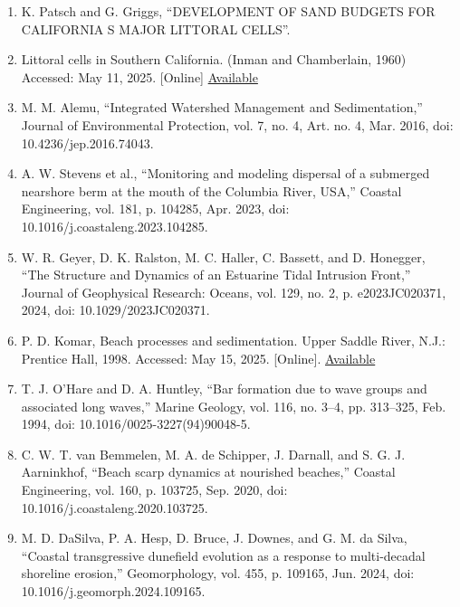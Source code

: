 \documentclass{article}
\begin{document}
{\begin{enumerate}
    \item{K. Patsch and G. Griggs, “DEVELOPMENT OF SAND BUDGETS FOR CALIFORNIA S MAJOR LITTORAL CELLS”.}

    \item{Littoral cells in Southern California. (Inman and Chamberlain, 1960) Accessed: May 11, 2025. [Online] \href{https://www.researchgate.net/figure/Littoral-cells-in-Southern-California-Inman-and-Chamberlain-1960-Thurman-and_fig4_240635473}{Available}}

    \item{M. M. Alemu, “Integrated Watershed Management and Sedimentation,” Journal of Environmental Protection, vol. 7, no. 4, Art. no. 4, Mar. 2016, doi: 10.4236/jep.2016.74043.}

    \item{A. W. Stevens et al., “Monitoring and modeling dispersal of a submerged nearshore berm at the mouth of the Columbia River, USA,” Coastal Engineering, vol. 181, p. 104285, Apr. 2023, doi: 10.1016/j.coastaleng.2023.104285.}

    \item{W. R. Geyer, D. K. Ralston, M. C. Haller, C. Bassett, and D. Honegger, “The Structure and Dynamics of an Estuarine Tidal Intrusion Front,” Journal of Geophysical Research: Oceans, vol. 129, no. 2, p. e2023JC020371, 2024, doi: 10.1029/2023JC020371.}

    \item{P. D. Komar, Beach processes and sedimentation. Upper Saddle River, N.J.: Prentice Hall, 1998. Accessed: May 15, 2025. [Online]. \href{http://archive.org/details/beachprocessesse0002koma}{Available}}

    \item{T. J. O’Hare and D. A. Huntley, “Bar formation due to wave groups and associated long waves,” Marine Geology, vol. 116, no. 3–4, pp. 313–325, Feb. 1994, doi: 10.1016/0025-3227(94)90048-5.}

    \item{C. W. T. van Bemmelen, M. A. de Schipper, J. Darnall, and S. G. J. Aarninkhof, “Beach scarp dynamics at nourished beaches,” Coastal Engineering, vol. 160, p. 103725, Sep. 2020, doi: 10.1016/j.coastaleng.2020.103725.}

    \item{M. D. DaSilva, P. A. Hesp, D. Bruce, J. Downes, and G. M. da Silva, “Coastal transgressive dunefield evolution as a response to multi-decadal shoreline erosion,” Geomorphology, vol. 455, p. 109165, Jun. 2024, doi: 10.1016/j.geomorph.2024.109165.}


\end{enumerate}}
\end{document}
